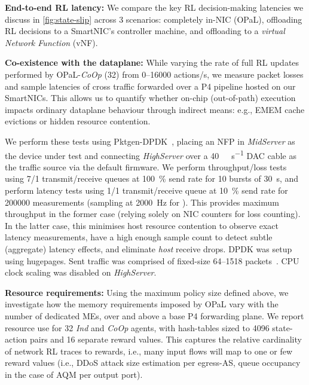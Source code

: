 \documentclass[
sigconf,natbib=false
]{acmart}
\newcommand{\fakepara}[1]{\noindent\textbf{#1:}}
\newcommand{\approachshort}{OPaL}
\newcommand{\Coopfw}{\emph{CoOp}}
\newcommand{\Indfw}{\emph{Ind}}
\begin{document}
\fakepara{End-to-end RL latency}
We compare the key RL decision-making latencies we discuss in \cref{fig:state-slip} across 3 scenarios: completely in-NIC (\approachshort{}), offloading RL decisions to a SmartNIC's controller machine, and offloading to a \emph{virtual Network Function} (vNF).

\fakepara{Co-existence with the dataplane}
While varying the rate of full RL updates performed by \approachshort{}-\Coopfw{} (\SI{32}{\bit}) from \numrange{0}{16000} actions/s, we measure packet losses and sample latencies of cross traffic forwarded over a P4 pipeline hosted on our SmartNICs.
This allows us to quantify whether on-chip (out-of-path) execution impacts ordinary dataplane behaviour through indirect means: e.g., EMEM cache evictions or hidden resource contention.

We perform these tests using Pktgen-DPDK~\cite{pktgen-dpdk}, placing an NFP in \emph{MidServer} as the device under test and connecting \emph{HighServer} over a \SI{40}{\giga\bit\per\second} DAC cable as the traffic source via the default firmware.
We perform throughput/loss tests using \num{7}/\num{1} transmit/receive queues at \SI{100}{\percent} send rate for 10 bursts of \SI{30}{\second}, and perform latency tests using \num{1}/\num{1} transmit/receive queue at \SI{10}{\percent} send rate for \num{200000} measurements (sampling at \SI{2000}{\hertz} for ).
This provides maximum throughput in the former case (relying solely on NIC counters for loss counting).
In the latter case, this minimises host resource contention to observe exact latency measurements, have a high enough sample count to detect subtle (aggregate) latency effects, and eliminate \emph{host} receive drops.
DPDK was setup using  hugepages.
Sent traffic was comprised of fixed-size \SIrange{64}{1518}{\byte} packets~\cite{rfc2544}.
CPU clock scaling was disabled on \emph{HighServer}.

\fakepara{Resource requirements}
Using the maximum policy size defined above, we investigate how the memory requirements imposed by \approachshort{} vary with the number of dedicated MEs, over and above a base P4 forwarding plane.
We report resource use for \SI{32}{\bit} \Indfw{} and \Coopfw{} agents, with hash-tables sized to \num{4096} state-action pairs and \num{16} separate reward values.
This captures the relative cardinality of network RL traces to rewards, i.e., many input flows will map to one or few reward values (i.e., DDoS attack size estimation per egress-AS, queue occupancy in the case of AQM per output port).
\end{document}
